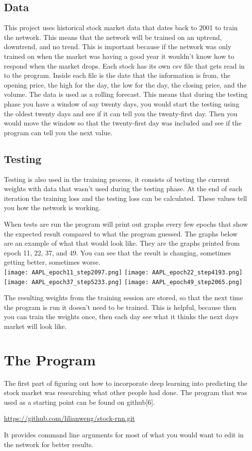 \documentclass{article}
\begin{document}
\subsection{Data}
This project uses historical stock market data that dates back to 2001 to train the network. This means that the network will be trained on an uptrend, downtrend, and no trend.
This is important because if the network was only trained on when the market was having a good year it wouldn't know how to respond when the market drops.
Each stock has its own csv file that gets read in to the program.
Inside each file is the date that the information is from, the opening price, the high for the day, the low for the day, the closing price, and the volume.
The data is used as a rolling forecast.
This means that during the testing phase you have a window of say twenty days, you would start the testing using the oldest twenty days and see if it can tell you the twenty-first day.
Then you would move the window so that the twenty-first day was included and see if the program can tell you the next value.

\subsection{Testing}
Testing is also used in the training process, it consists of testing the current weights with data that wasn't used during the testing phase. 
At the end of each iteration the training loss and the testing loss can be calculated.
These values tell you how the network is working.

When tests are run the program will print out graphs every few epochs that show the expected result compared to what the program guessed. 
The graphs below are an example of what that would look like.
They are the graphs printed from epoch 11, 22, 37, and 49.
You can see that the result is changing, sometimes getting better, sometimes worse.\\

\texttt{[image: AAPL\_epoch11\_step2097.png]}
\texttt{[image: AAPL\_epoch22\_step4193.png]}
\texttt{[image: AAPL\_epoch37\_step5233.png]}
\texttt{[image: AAPL\_epoch49\_step2065.png]}

The resulting weights from the training session are stored, so that the next time the program is run it doesn't need to be trained.
This is helpful, because then you can train the weights once, then each day see what it thinks the next days market will look like.


\section{The Program}
The first part of figuring out how to incorporate deep learning into predicting the stock market was researching what other people had done.
The program that was used as a starting point can be found on github[6]. 
\begin{center} \url{https://github.com/lilianweng/stock-rnn.git} \end{center}
It provides command line arguments for most of what you would want to edit in the network for better results.
\end{document}
